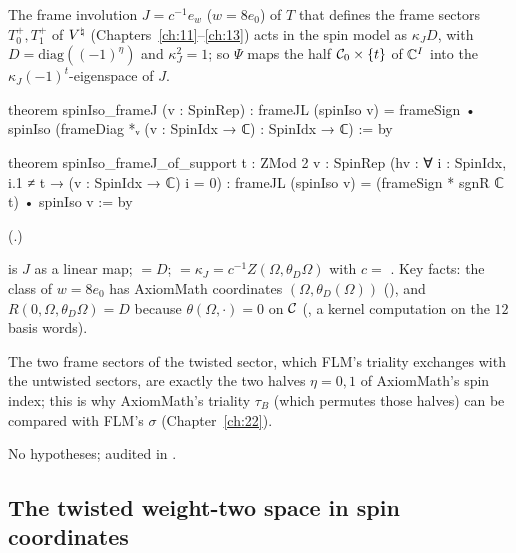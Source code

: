 \begin{theorem}\label{ch21:thm:frame}
The frame involution $J=c^{-1}e_w$ ($w=8e_0$) of $T$ that defines the frame sectors $T_0^+,T_1^+$ of
${V^{\natural}}$ (Chapters~\ref{ch:11}--\ref{ch:13}) acts in the spin model as $\kappa_J D$, with
$D=\mathrm{diag}((-1)^\eta)$ and $\kappa_J^2=1$; so $\Psi$ maps the half $\mathcal{C}_0\times\{t\}$ of ${\mathbb{C}}^I$
into the $\kappa_J(-1)^t$-eigenspace of $J$.
\end{theorem}
\begin{leancode}
theorem spinIso_frameJ (v : SpinRep) :
    frameJL (spinIso v) = frameSign • spinIso (frameDiag *ᵥ (v : SpinIdx → ℂ) : SpinIdx → ℂ) := by
\end{leancode}
\begin{leancode}
theorem spinIso_frameJ_of_support {t : ZMod 2} {v : SpinRep}
    (hv : ∀ i : SpinIdx, i.1 ≠ t → (v : SpinIdx → ℂ) i = 0) :
    frameJL (spinIso v) = (frameSign * sgnR ℂ t) • spinIso v := by
\end{leancode}
(.)
\begin{dictionary}
 is $J$ as a linear map;  $=D$;  $=\kappa_J=c^{-1}Z(\Omega,\theta_D\Omega)$
with $c=$ .  Key facts: the class of $w=8e_0$ has AxiomMath coordinates
$(\Omega,\theta_D(\Omega))$ (), and $R(0,\Omega,\theta_D\Omega)=D$ because
$\theta(\Omega,\cdot)=0$ on $\mathcal{C}$ (, a kernel computation on the $12$ basis
words).
\end{dictionary}
\begin{physics}
The two frame sectors of the twisted sector, which FLM's triality exchanges with the untwisted
sectors, are exactly the two halves $\eta=0,1$ of AxiomMath's spin index; this is why AxiomMath's
triality $\tau_B$ (which permutes those halves) can be compared with FLM's $\sigma$ (Chapter~\ref{ch:22}).
\end{physics}
\begin{status}
No hypotheses; audited in .
\end{status}

\subsection{The twisted weight-two space in spin coordinates}

